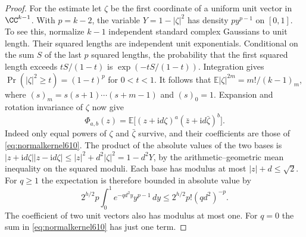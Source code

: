 \documentclass[a4paper,11pt]{article}
\theoremstyle{definition}
\theoremstyle{remark}
\numberwithin{equation}{section}
\begin{document}
\begin{proof}
For the estimate let \(\zeta\) be the first coordinate of a
uniform unit vector in \(\CC^{k-1}\). With \(p=k-2\), the variable
\(Y=1-|\zeta|^2\) has density \(p y^{p-1}\) on \([0,1]\).
To see this, normalize \(k-1\) independent standard complex
Gaussians to unit length. Their squared lengths are independent
unit exponentials. Conditional on the sum \(S\) of the last \(p\)
squared lengths, the probability that the first squared length
exceeds \(tS/(1-t)\) is \(\exp(-tS/(1-t))\). Integration gives
\(\Pr(|\zeta|^2\ge t)=(1-t)^p\) for \(0<t<1\).
It follows that \(\mathbb E|\zeta|^{2m}=m!/(k-1)_m\), where
\((s)_m=s(s+1)\cdots(s+m-1)\) and \((s)_0=1\). Expansion and
rotation invariance of \(\zeta\) now give
\[
  \Phi_{a,b}(z)=\mathbb E\big[(z+\mathrm i d\zeta)^a
                          (\bar z+\mathrm i d\bar\zeta)^b\big].
\]
Indeed only equal powers of \(\zeta\) and \(\bar\zeta\) survive,
and their coefficients are those of \eqref{eq:normalkernel610}.
The product of the absolute values of the two bases is
\(\lvert z+\mathrm i d\zeta\rvert\lvert z-\mathrm i d\zeta\rvert
\le |z|^2+d^2|\zeta|^2=1-d^2Y\), by the arithmetic--geometric
mean inequality on the squared moduli. Each base has modulus at
most \(|z|+d\le\sqrt 2\). For \(q\ge1\) the expectation is
therefore bounded in absolute value by
\[
  2^{h/2}p\int_0^1 e^{-q d^2y}y^{p-1}\,dy
       \le 2^{h/2}p!(q d^2)^{-p}.
\]
The coefficient of two unit vectors also has modulus at most one.
For \(q=0\) the sum in \eqref{eq:normalkernel610} has just one term.
\end{proof}
\end{document}
